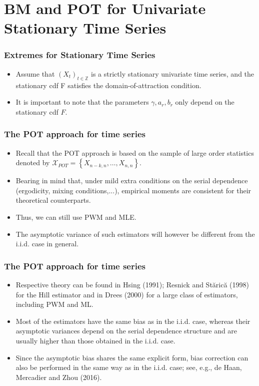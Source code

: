 \documentclass{beamer}
\newcommand{\suit}[1]{\left(#1\right)}
\newcommand{\set}[1]{\left\{#1\right\}}
\begin{document}
\section{BM and POT for Univariate Stationary Time Series}
\begin{frame}
    \frametitle{Extremes for Stationary Time Series}
\begin{itemize}
    \item Assume that $\suit{X_t}_{t\in \mathbb{Z}}$ is a strictly stationary univariate time series, and the
    stationary cdf F satisfies the domain-of-attraction condition.
    \item It is important to note that
    the parameters $\gamma,a_r,b_r$ only depend on the stationary cdf $F$.
\end{itemize}
    

\end{frame}


\begin{frame}
    \frametitle{The POT approach for time series}

\begin{itemize}
    \item    Recall that the POT approach is based on the sample of large order statistics denoted by $\mathcal{X}_{POT}=\set{X_{n-k,n},\dots, X_{n,n}}$.
    \item Bearing in mind that, under mild extra conditions on the serial
    dependence (ergodicity, mixing conditions,...), empirical moments are consistent for their theoretical counterparts.
    \item Thus, we can still use PWM and MLE.
    \item The asymptotic variance of such estimators will however
    be different from the i.i.d. case in general.
\end{itemize}
\end{frame}

\begin{frame}
    \frametitle{The POT approach for time series}
\begin{itemize}
    \item Respective theory can be found in Hsing (1991); Resnick and Stărică (1998) for the Hill estimator and in Drees (2000) for a large class of estimators, including PWM and ML.
    \item Most of the
    estimators have the same bias as in the i.i.d. case, whereas their asymptotic variances depend
    on the serial dependence structure and are usually higher than those obtained in the i.i.d. case.
    \item Since the asymptotic bias shares the same explicit form, bias correction can also be performed
    in the same way as in the i.i.d. case; see, e.g., de Haan, Mercadier and Zhou (2016).
\end{itemize}
    

\end{frame}
\end{document}
